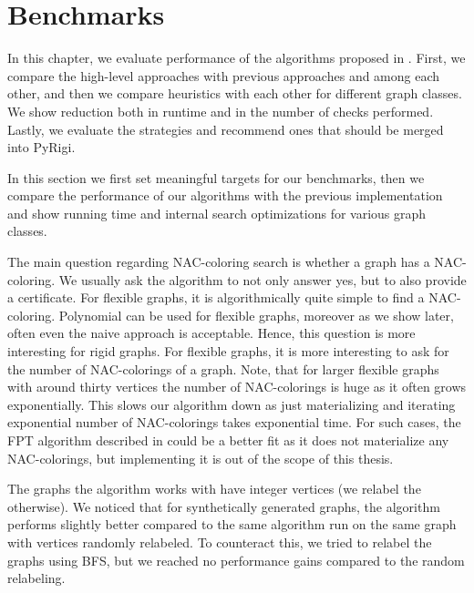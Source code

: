 \chapter{Benchmarks}%
\label{chapter:benchmarks}

\begin{chapterabstract}

	In this chapter,
	we evaluate performance of the algorithms
	proposed in .
	First, we compare the high-level approaches with previous approaches and among each other,
	and then we compare heuristics with each other
	for different  graph classes.
	We show reduction both in runtime and in the number
	of \IsNACColoring{} checks performed.
	Lastly, we evaluate the strategies and
	recommend ones that should be merged into PyRigi.

\end{chapterabstract}

In this section we first set meaningful targets for our benchmarks,
then we compare the performance of our algorithms with the previous implementation
and show running time and internal search optimizations for various graph classes.

The main question regarding NAC-coloring search is whether a graph has a NAC-coloring.
We usually ask the algorithm to not only answer yes, but to also provide a certificate.
%
For flexible graphs, it is algorithmically quite simple to find a NAC-coloring.
Polynomial 
can be used for flexible graphs,
moreover as we show later, often even the naive approach is acceptable.
Hence, this question is more interesting for rigid graphs.
%
For flexible graphs, it is more interesting to ask for the number of NAC-colorings
of a graph.
Note, that for larger flexible graphs with around thirty vertices
the number of NAC-colorings is huge as it often grows exponentially.
This slows our algorithm down as just materializing and iterating exponential
number of NAC-colorings takes exponential time.
%
For such cases, the FPT algorithm described in 
could be a better fit as it does not materialize any NAC-colorings,
but implementing it is out of the scope of this thesis.

The graphs the algorithm works with have integer vertices (we relabel the otherwise).
We noticed that for synthetically generated graphs,
the algorithm performs slightly better compared to
the same algorithm run on the same graph with vertices randomly relabeled.
To counteract this, we tried to relabel the graphs using BFS,
but we reached no performance gains compared to the random relabeling.

